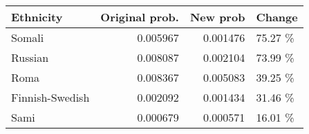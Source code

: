 \begin{tabular}{lrrl}
\toprule
      Ethnicity &  Original prob. &  New prob &  Change \\
\midrule
         Somali &        0.005967 &  0.001476 & 75.27 \% \\
        Russian &        0.008087 &  0.002104 & 73.99 \% \\
           Roma &        0.008367 &  0.005083 & 39.25 \% \\
Finnish-Swedish &        0.002092 &  0.001434 & 31.46 \% \\
           Sami &        0.000679 &  0.000571 & 16.01 \% \\
\bottomrule
\end{tabular}
